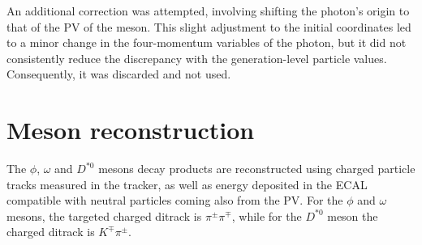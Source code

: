 \begin{myitemlist}
    An additional correction was attempted, involving shifting the photon's origin to that of the PV of the meson. This slight adjustment to the initial coordinates led to a minor change in the four-momentum variables of the photon, but it did not consistently reduce the discrepancy with the generation-level particle values. Consequently, it was discarded and not used.

\end{myitemlist}

\section{Meson reconstruction }\label{sec:meson_reconstruction}

The $\phi$, $\omega$ and $D^{*0}$ mesons decay products are reconstructed using charged particle tracks measured in the tracker, as well as energy deposited in the ECAL compatible with neutral particles coming also from the PV. For the $\phi$ and $\omega$ mesons, the targeted charged ditrack is $\pi^\pm\pi^\mp$, while for the $D^{*0}$ meson the charged ditrack is $K^{\mp}\pi^{\pm}$.

